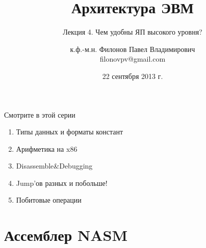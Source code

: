 \documentclass[utf8, russian]{beamer}
\title{Архитектура ЭВМ}
\subtitle{Лекция 4. Чем удобны ЯП высокого уровня?}
\author{к.ф.-м.н. Филонов Павел Владимирович \\ filonovpv@gmail.com}
\date{22 сентября 2013 г.}
\institute[МГТУ ГА] 
{
    Московский Государственный Технический Университет \\
    Гражданской Авиации
}
\begin{document}
    \frame{\titlepage}
    \begin{frame}{Смотрите в этой серии}
        \begin{enumerate}
        \pause
        \item Типы данных и форматы констант
        \pause
        \item Арифметика на x86
        \pause
        \item Disassemble\&Debugging 
        \pause
        \item Jump'ов разных и побольше!
        \pause
        \item Побитовые операции
        \end{enumerate}
    \end{frame}
    \section{Ассемблер NASM}
\end{document}
